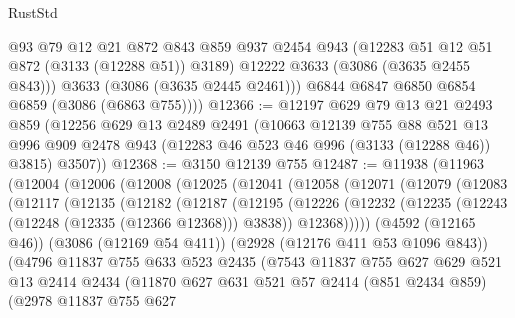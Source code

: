 \begin{lexlean}{RustStd}
\begin{coremodule}
            @93
            @79
            @12
            @21
            @872
            @843
            @859
            @937
            @2454
            @943
            (@12283 @51 @12 @51 @872 (@3133 (@12288 @51)) @3189)
            @12222
            @3633
            (@3086 (@3635 @2455 @843)))
          @3633
          (@3086 (@3635 @2445 @2461)))
        @6844
        @6847
        @6850
        @6854
        @6859
        (@3086 (@6863 @755))))
@12366 := @12197
    @629
    @79
    @13
    @21
    @2493
    @859
    (@12256
      @629
      @13
      @2489
      @2491
      (@10663
        @12139
        @755
        @88
        @521
        @13
        @996
        @909
        @2478
        @943
        (@12283 @46 @523 @46 @996 (@3133 (@12288 @46)) @3815)
        @3507))
@12368 := @3150 @12139 @755
@12487 := @11938
    (@11963
      (@12004
        (@12006
          (@12008
            (@12025
              (@12041
                (@12058
                  (@12071
                    (@12079
                      (@12083
                        (@12117
                          (@12135
                            (@12182
                              (@12187
                                (@12195
                                  (@12226
                                    (@12232
                                      (@12235 (@12243 (@12248 (@12335 (@12366 @12368))) @3838))
                                      @12368)))))
                            (@4592 (@12165 @46))
                            (@3086 (@12169 @54 @411))
                            (@2928 (@12176 @411 @53 @1096 @843))
                            (@4796
                              @11837
                              @755
                              @633
                              @523
                              @2435
                              (@7543
                                @11837
                                @755
                                @627
                                @629
                                @521
                                @13
                                @2414
                                @2434
                                (@11870
                                  @627
                                  @631
                                  @521
                                  @57
                                  @2414
                                  (@851 @2434 @859)
                                  (@2978
                                    @11837
                                    @755
                                    @627

\end{coremodule}
\end{lexlean}
